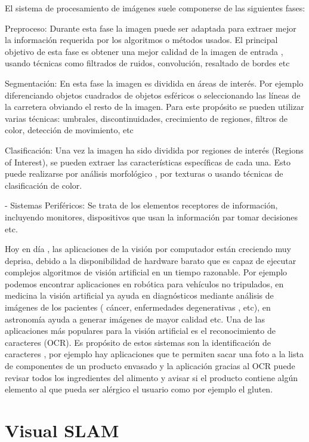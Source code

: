 	El sistema de procesamiento de imágenes suele componerse de las siguientes fases:

		Preproceso: Durante esta fase la imagen puede ser adaptada para extraer mejor la información requerida por los algoritmos o métodos usados. El principal objetivo de esta fase es obtener una mejor calidad de la imagen de entrada , usando técnicas como filtrados de ruidos, convolución, resaltado de bordes etc

		Segmentación: En esta fase la imagen es dividida en áreas de interés. Por ejemplo diferenciando objetos cuadrados de objetos esféricos o seleccionando las líneas de la carretera obviando el resto de la imagen. Para este propósito se pueden utilizar varias técnicas: umbrales, discontinuidades, crecimiento de regiones, filtros de color, detección de movimiento, etc

		Clasificación: Una vez la imagen ha sido dividida por regiones de interés (Regions of Interest), se pueden extraer las características específicas de cada una. Esto puede realizarse por análisis morfológico , por texturas o usando técnicas de clasificación de color.

	- Sistemas Periféricos: Se trata de los elementos receptores de información, incluyendo monitores, dispositivos que usan la información par tomar decisiones etc.

Hoy en día , las aplicaciones de la visión por computador están creciendo muy deprisa, debido a la disponibilidad de hardware barato que es capaz de ejecutar complejos algoritmos de visión artificial en un tiempo razonable. Por ejemplo podemos encontrar aplicaciones en robótica para vehículos no tripulados, en medicina la visión artificial ya ayuda en diagnósticos mediante análisis de imágenes de los pacientes ( cáncer, enfermedades degenerativas , etc), en astronomía ayuda a generar imágenes de mayor calidad etc.
Una de las aplicaciones más populares para la visión artificial es el reconocimiento de caracteres (OCR). Es propósito de estos sistemas son la identificación de caracteres , por ejemplo hay aplicaciones que te permiten sacar una foto a la lista de componentes de un producto envasado y la aplicación gracias al OCR puede revisar todos los ingredientes del alimento y avisar si el producto contiene algún elemento al que pueda ser alérgico el usuario como por ejemplo el gluten.



\section{Visual SLAM}

